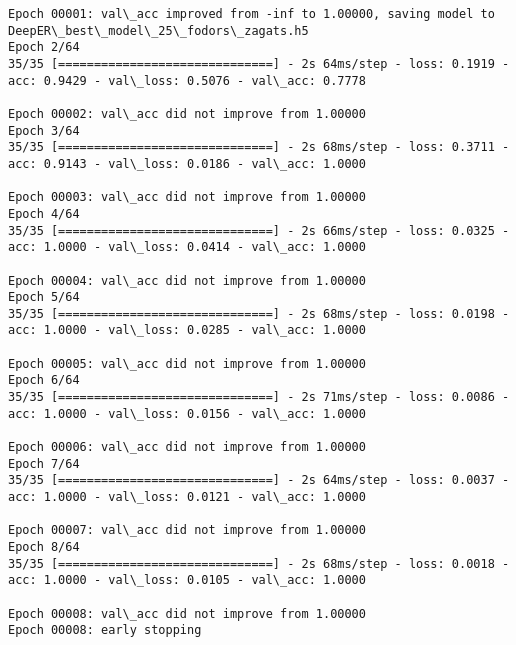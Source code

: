 \documentclass[11pt]{article}
\begin{document}
\begin{Verbatim}[commandchars=\\\{\}]
Epoch 00001: val\_acc improved from -inf to 1.00000, saving model to DeepER\_best\_model\_25\_fodors\_zagats.h5
Epoch 2/64
35/35 [==============================] - 2s 64ms/step - loss: 0.1919 - acc: 0.9429 - val\_loss: 0.5076 - val\_acc: 0.7778

Epoch 00002: val\_acc did not improve from 1.00000
Epoch 3/64
35/35 [==============================] - 2s 68ms/step - loss: 0.3711 - acc: 0.9143 - val\_loss: 0.0186 - val\_acc: 1.0000

Epoch 00003: val\_acc did not improve from 1.00000
Epoch 4/64
35/35 [==============================] - 2s 66ms/step - loss: 0.0325 - acc: 1.0000 - val\_loss: 0.0414 - val\_acc: 1.0000

Epoch 00004: val\_acc did not improve from 1.00000
Epoch 5/64
35/35 [==============================] - 2s 68ms/step - loss: 0.0198 - acc: 1.0000 - val\_loss: 0.0285 - val\_acc: 1.0000

Epoch 00005: val\_acc did not improve from 1.00000
Epoch 6/64
35/35 [==============================] - 2s 71ms/step - loss: 0.0086 - acc: 1.0000 - val\_loss: 0.0156 - val\_acc: 1.0000

Epoch 00006: val\_acc did not improve from 1.00000
Epoch 7/64
35/35 [==============================] - 2s 64ms/step - loss: 0.0037 - acc: 1.0000 - val\_loss: 0.0121 - val\_acc: 1.0000

Epoch 00007: val\_acc did not improve from 1.00000
Epoch 8/64
35/35 [==============================] - 2s 68ms/step - loss: 0.0018 - acc: 1.0000 - val\_loss: 0.0105 - val\_acc: 1.0000

Epoch 00008: val\_acc did not improve from 1.00000
Epoch 00008: early stopping


\end{Verbatim}
\end{document}
